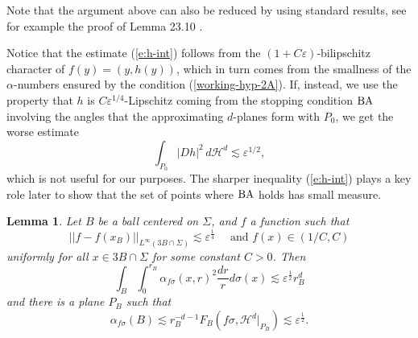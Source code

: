 \documentclass[11pt]{amsart}
\newcommand{\HH}{{\mathcal H}}
\newcommand{\rf}[1]{{(\ref{#1})}}
\newcommand{\ve}{{\varepsilon}}
\newcommand{\Bl}{\color{blue}}
\newtheorem{lemma}[theorem]{Lemma}
\theoremstyle{definition}
\theoremstyle{remark}
\def\BA{{\rm BA}}
\numberwithin{equation}{section}
\newcommand{\xavi}[1]{}%
\def\cH{{\mathcal{H}}}
\def\lec{\lesssim}
\def\lec{\lesssim}
\newcommand{\jonas}[1]{}%
\begin{document}
Note that the argument above can also be reduced by using standard results, see for example the proof of Lemma 23.10 \cite{Maggi}. 
 
Notice that the estimate \rf{e:h-int} follows from the $(1+C\ve)$-bilipschitz character of $f(y)=(y,h(y))$,
which in turn comes from the smallness of the $\alpha$-numbers ensured by the condition \rf{working-hyp-2A}. If, instead, we use the property that $h$ is $C\ve^{1/4}$-Lipschitz coming from the stopping condition $\BA$ involving the angles that the approximating $d$-planes form with $P_0$, we get the worse estimate
$$\int_{P_{0}} |D h|^{2}\,d\HH^d \lesssim \ve^{1/2},$$
which is not useful for our purposes. The sharper inequality
\rf{e:h-int} plays a key role 
later to show that the set of points where $\BA$ holds has small measure.


 

\begin{lemma}  \label{l:Xavi-lemma}
	Let $B$ be a ball centered on $\Sigma$, and $f$ a function such that 
	$$||f-f(x_{B})||_{L^\infty(3B\cap \Sigma)} \lec \ve^{\frac14}\quad \mbox{ and }f(x)\in (1/C,C)$$ uniformly for all $x\in 3B\cap\Sigma$ for some constant $C>0$. Then
	\begin{equation}\label{e:Xavi-lemma}
	\int_{B}\int_{0}^{r_{B}} \alpha_{f\sigma}(x,r)^{2}\frac{dr}{r}d\sigma(x) \lec \ve^{\frac12} r_{B}^{d}
	\end{equation}
	and there is a plane $P_{B}$ such that \xavi{I replaced $\sigma$ by $f\sigma$ inside $F_B(...)$ here}
	\begin{equation}\label{e:a<e}
	\alpha_{f\sigma}(B)\lec r_{B}^{-d-1} F_{B}( f\sigma,\cH^{d}|_{P_{B}})\lec \ve^{\frac12}.
	\end{equation}
\end{lemma}
\end{document}
